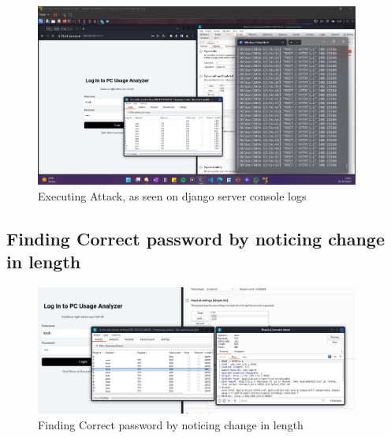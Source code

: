 \documentclass[11pt]{article}
\begin{document}
\begin{figure}[H]
    \centering
    \includegraphics[width=0.95\textwidth]{burpsuite (10).png}
    \caption{Executing Attack, as seen on django server console logs}
    \label{fig:1}
\end{figure}
\subsection{Finding Correct password by noticing change in length}




\begin{figure}[H]
    \centering
    \includegraphics[width=0.95\textwidth]{burpsuite (11).png}
    \caption{Finding Correct password by noticing change in length}
    \label{fig:1}
\end{figure}
\end{document}
